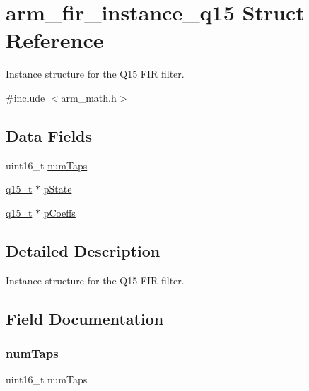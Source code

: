 \hypertarget{structarm__fir__instance__q15}{}\section{arm\+\_\+fir\+\_\+instance\+\_\+q15 Struct Reference}
\label{structarm__fir__instance__q15}


Instance structure for the Q15 F\+IR filter.  




{\ttfamily \#include $<$arm\+\_\+math.\+h$>$}

\subsection*{Data Fields}
\begin{DoxyCompactItemize}
\item 
uint16\+\_\+t \mbox{\hyperlink{structarm__fir__instance__q15_a751941891e47f522a7f5375fe8990aac}{num\+Taps}}
\item 
\mbox{\hyperlink{arm__math_8h_ab5a8fb21a5b3b983d5f54f31614052ea}{q15\+\_\+t}} $\ast$ \mbox{\hyperlink{structarm__fir__instance__q15_ae29dfdb736374fcddaeaec4b7770170c}{p\+State}}
\item 
\mbox{\hyperlink{arm__math_8h_ab5a8fb21a5b3b983d5f54f31614052ea}{q15\+\_\+t}} $\ast$ \mbox{\hyperlink{structarm__fir__instance__q15_a7ca181a37f714d174445f486bebce26f}{p\+Coeffs}}
\end{DoxyCompactItemize}


\subsection{Detailed Description}
Instance structure for the Q15 F\+IR filter. 

\subsection{Field Documentation}
\mbox{\label{structarm__fir__instance__q15_a751941891e47f522a7f5375fe8990aac}} 
\subsubsection{\texorpdfstring{numTaps}{numTaps}}
{\footnotesize\ttfamily uint16\+\_\+t num\+Taps}

